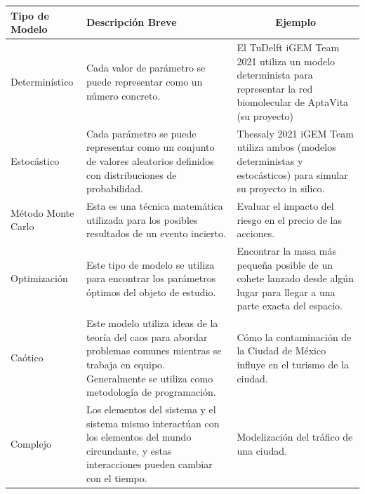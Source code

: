 \documentclass[11pt, letterpaper, spanish]{article}
\begin{document}
{{\begin{table}[h]

\begin{tabular}{ | m{3cm} | m{7cm}| m{6.2cm} | } 
\hline
\textbf{Tipo de Modelo} & {\color[HTML]{000000} \textbf{Descripción Breve}}                                                                                                    & \multicolumn{1}{c|}{\textbf{Ejemplo}}                                  \\ \hline
Determinístico                                 & Cada valor de parámetro se puede representar como un número concreto.                                                                                        & El TuDelft iGEM Team 2021 utiliza un modelo determinista para representar la red biomolecular de AptaVita (su proyecto)\\ \hline
Estocástico                                    & Cada parámetro se puede representar como un conjunto de valores aleatorios definidos con distribuciones de probabilidad.                                                  & Thessaly 2021 iGEM Team utiliza ambos (modelos deterministas y estocásticos) para simular su proyecto in silico.             \\ \hline
Método Monte Carlo                            & Esta es una técnica matemática utilizada para los posibles resultados de un evento incierto.                                                             &   Evaluar el impacto del riesgo en el precio de las acciones. %
\\ \hline
Optimización                                  & Este tipo de modelo se utiliza para encontrar los parámetros óptimos del objeto de estudio.                                                                     & Encontrar la masa más pequeña posible de un cohete lanzado desde algún lugar para llegar a una parte exacta del espacio.            \\ \hline
Caótico                                       & Este modelo utiliza ideas de la teoría del caos para abordar problemas comunes mientras se trabaja en equipo. Generalmente se utiliza como metodología de programación. & Cómo la contaminación de la Ciudad de México influye en el turismo de la ciudad.                                                            \\ \hline
Complejo                                       & Los elementos del sistema y el sistema mismo interactúan con los elementos del mundo circundante, y estas interacciones pueden cambiar con el tiempo. & Modelización del tráfico de una ciudad.                                                                                \\ \hline
    

\end{tabular}
\end{table}}}
\end{document}
